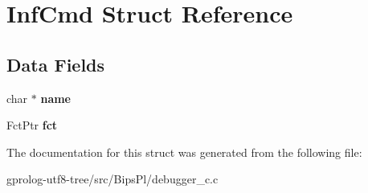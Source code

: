 \hypertarget{structInfCmd}{}\section{Inf\+Cmd Struct Reference}
\label{structInfCmd}
\subsection*{Data Fields}
\begin{DoxyCompactItemize}
\item 
char $\ast$ {\bfseries name}\hypertarget{structInfCmd_af3fea806d68a1051611b2858d1aa2747}{}\label{structInfCmd_af3fea806d68a1051611b2858d1aa2747}

\item 
Fct\+Ptr {\bfseries fct}\hypertarget{structInfCmd_a4b390073530117560b83be4116a49e0b}{}\label{structInfCmd_a4b390073530117560b83be4116a49e0b}

\end{DoxyCompactItemize}


The documentation for this struct was generated from the following file\+:\begin{DoxyCompactItemize}
\item 
gprolog-\/utf8-\/tree/src/\+Bips\+Pl/debugger\+\_\+c.\+c\end{DoxyCompactItemize}
